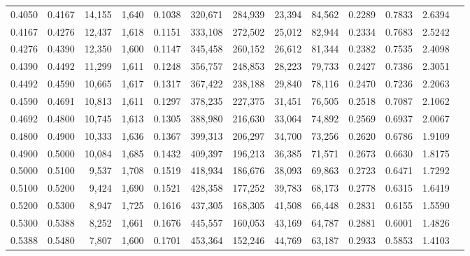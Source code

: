\begin{tabular}{rrrrrrrrrrrrr}
0.4050 & 0.4167 & 14,155 & 1,640 &                                     0.1038 & 320,671 & 284,939 &  23,394 &  84,562 & 0.2289 & 0.7833 & 2.6394 \\
0.4167 & 0.4276 & 12,437 & 1,618 &                                     0.1151 & 333,108 & 272,502 &  25,012 &  82,944 & 0.2334 & 0.7683 & 2.5242 \\
0.4276 & 0.4390 & 12,350 & 1,600 &                                     0.1147 & 345,458 & 260,152 &  26,612 &  81,344 & 0.2382 & 0.7535 & 2.4098 \\
0.4390 & 0.4492 & 11,299 & 1,611 &                                     0.1248 & 356,757 & 248,853 &  28,223 &  79,733 & 0.2427 & 0.7386 & 2.3051 \\
0.4492 & 0.4590 & 10,665 & 1,617 &                                     0.1317 & 367,422 & 238,188 &  29,840 &  78,116 & 0.2470 & 0.7236 & 2.2063 \\
0.4590 & 0.4691 & 10,813 & 1,611 &                                     0.1297 & 378,235 & 227,375 &  31,451 &  76,505 & 0.2518 & 0.7087 & 2.1062 \\
0.4692 & 0.4800 & 10,745 & 1,613 &                                     0.1305 & 388,980 & 216,630 &  33,064 &  74,892 & 0.2569 & 0.6937 & 2.0067 \\
0.4800 & 0.4900 & 10,333 & 1,636 &                                     0.1367 & 399,313 & 206,297 &  34,700 &  73,256 & 0.2620 & 0.6786 & 1.9109 \\
0.4900 & 0.5000 & 10,084 & 1,685 &                                     0.1432 & 409,397 & 196,213 &  36,385 &  71,571 & 0.2673 & 0.6630 & 1.8175 \\
0.5000 & 0.5100 &  9,537 & 1,708 &                                     0.1519 & 418,934 & 186,676 &  38,093 &  69,863 & 0.2723 & 0.6471 & 1.7292 \\
0.5100 & 0.5200 &  9,424 & 1,690 &                                     0.1521 & 428,358 & 177,252 &  39,783 &  68,173 & 0.2778 & 0.6315 & 1.6419 \\
0.5200 & 0.5300 &  8,947 & 1,725 &                                     0.1616 & 437,305 & 168,305 &  41,508 &  66,448 & 0.2831 & 0.6155 & 1.5590 \\
0.5300 & 0.5388 &  8,252 & 1,661 &                                     0.1676 & 445,557 & 160,053 &  43,169 &  64,787 & 0.2881 & 0.6001 & 1.4826 \\
0.5388 & 0.5480 &  7,807 & 1,600 &                                     0.1701 & 453,364 & 152,246 &  44,769 &  63,187 & 0.2933 & 0.5853 & 1.4103 \\

\end{tabular}
